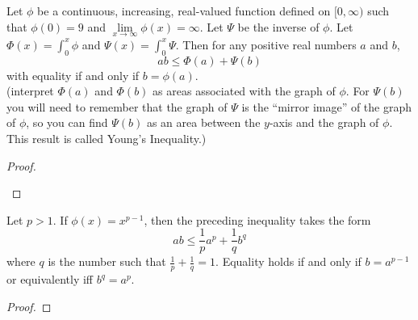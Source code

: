 \begin{pblm} %
	Let $\phi$ be a continuous, increasing, real-valued function defined on $[0,\infty)$ 
	such that $\phi(0) = 9$ and $\lim\limits_{x\to\infty}\phi(x) = \infty$. Let 
	$\varPsi$ be the inverse of $\phi$. Let 
	$\Phi(x) = \int_0^x\phi$ and $\Psi(x) = \int_0^x\varPsi$. Then for any positive real 
	numbers $a$ and $b$, 
	\begin{equation*}
		ab \le \Phi(a) + \Psi(b)
	\end{equation*}
	with equality if and only if $b = \phi(a)$. \\
	{\scriptsize{(interpret $\Phi(a)$ and $\Phi(b)$ as areas associated with the graph of 
	$\phi$. For $\Psi(b)$ you will need to remember that the graph of $\varPsi$ is the 
	``mirror image'' of the graph of $\phi$, so you can find $\Psi(b)$ as an area between 
	the $y$-axis and the graph of $\phi$. This result is called Young's Inequality.)}}
\begin{proof}

	\begin{center}
	\end{center}
\end{proof}
\end{pblm}

\begin{pblm}%
	Let $p > 1$. If $\phi(x) = x^{p-1}$, then the preceding inequality takes the form 
	\begin{equation*}
		ab \le \frac{1}{p}a^p + \frac{1}{q}b^q
	\end{equation*}
	where $q$ is the number such that $\frac{1}{p} + \frac{1}{q} = 1$. Equality holds if 
	and only if $b = a^{p-1}$ or equivalently iff $b^q = a^p$. 
\begin{proof}
\end{proof}
\end{pblm}

